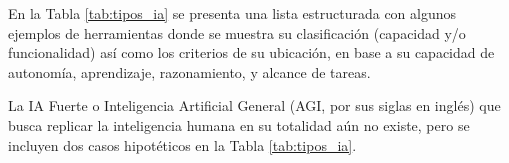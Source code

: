 \documentclass[11pt,letterpaper]{article}
\begin{document}
En la Tabla \ref{tab:tipos_ia} se presenta una lista estructurada con algunos ejemplos de herramientas donde se muestra su clasificación (capacidad y/o funcionalidad) así como los criterios de su ubicación, en base a su capacidad de autonomía, aprendizaje, razonamiento, y alcance de tareas.

La IA Fuerte o Inteligencia Artificial General (AGI, por sus siglas en inglés) que busca replicar la inteligencia humana en su totalidad aún no existe, pero se incluyen dos casos hipotéticos en la Tabla \ref{tab:tipos_ia}.

\vspace{5mm}

\newcommand{\tipo}[2]{\textbf{Capacidad:} #1\newline\textbf{Funcionalidad:} #2}
\end{document}
